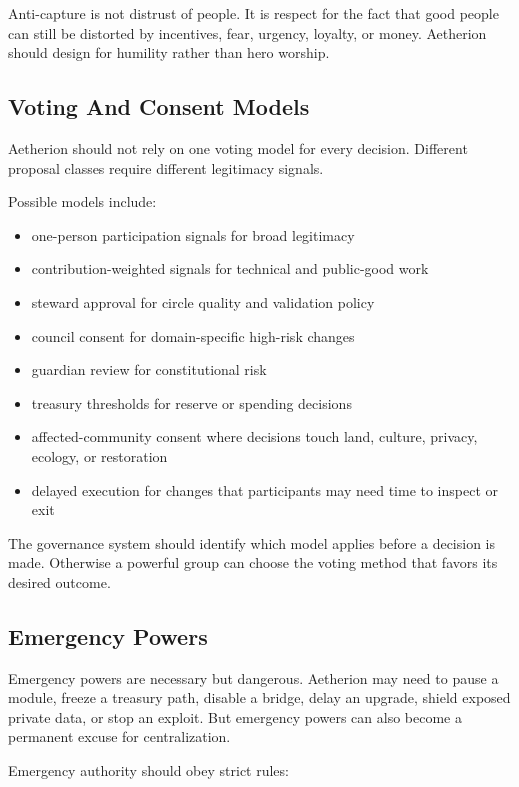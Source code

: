 \documentclass[12pt]{article}
\begin{document}
Anti-capture is not distrust of people. It is respect for the fact that good people can still be distorted by incentives, fear, urgency, loyalty, or money. Aetherion should design for humility rather than hero worship.

\subsection{Voting And Consent Models}

Aetherion should not rely on one voting model for every decision. Different proposal classes require different legitimacy signals.

Possible models include:

\begin{itemize}
  \item one-person participation signals for broad legitimacy
  \item contribution-weighted signals for technical and public-good work
  \item steward approval for circle quality and validation policy
  \item council consent for domain-specific high-risk changes
  \item guardian review for constitutional risk
  \item treasury thresholds for reserve or spending decisions
  \item affected-community consent where decisions touch land, culture, privacy, ecology, or restoration
  \item delayed execution for changes that participants may need time to inspect or exit
\end{itemize}

The governance system should identify which model applies before a decision is made. Otherwise a powerful group can choose the voting method that favors its desired outcome.

\subsection{Emergency Powers}

Emergency powers are necessary but dangerous. Aetherion may need to pause a module, freeze a treasury path, disable a bridge, delay an upgrade, shield exposed private data, or stop an exploit. But emergency powers can also become a permanent excuse for centralization.

Emergency authority should obey strict rules:
\end{document}
